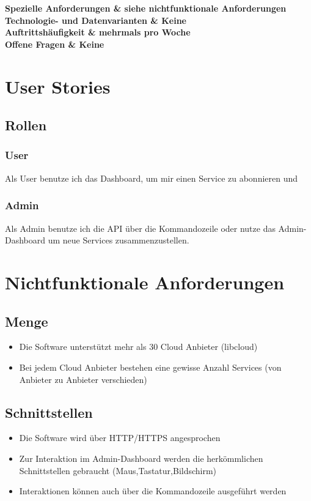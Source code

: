 \documentclass[11pt]{scrartcl}
\begin{document}
\begin{longtabu}
	\bfseries Spezielle Anforderungen & siehe nichtfunktionale Anforderungen  \\\hline 
	\bfseries Technologie- und Datenvarianten & Keine  \\\hline 
	\bfseries Auftrittshäufigkeit & mehrmals pro Woche  \\\hline 
	\bfseries Offene Fragen & Keine  \\\hline  
\end{longtabu}
\newpage
\section{User Stories}
\subsection{Rollen}
\subsubsection{User}
Als User benutze ich das Dashboard, um mir einen Service zu abonnieren und 
\subsubsection{Admin}
Als Admin benutze ich die API über die Kommandozeile oder nutze das 
Admin-Dashboard um neue Services zusammenzustellen.



\section{Nichtfunktionale Anforderungen}
\subsection{Menge}
\begin{itemize}
  \item Die Software unterstützt mehr als 30 Cloud Anbieter (libcloud)
  \item Bei jedem Cloud Anbieter bestehen eine gewisse Anzahl Services (von Anbieter zu Anbieter verschieden)
\end{itemize}

\subsection{Schnittstellen}
\begin{itemize}
  \item Die Software wird über HTTP/HTTPS angesprochen
  \item Zur Interaktion im Admin-Dashboard werden die herkömmlichen 
  Schnittstellen gebraucht (Maus,Tastatur,Bildschirm)
  \item Interaktionen können auch über die Kommandozeile ausgeführt werden
\end{itemize}
\end{document}
